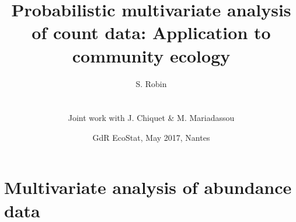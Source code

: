 \documentclass[10pt]{beamer}
\newcommand{\fignet}{/home/robin/Bureau/RECHERCHE/RESEAUX/EXPOSES/FIGURES}
\begin{document}

\title[Probabilistic PCA for counts]{Probabilistic multivariate analysis of count data: Application to community ecology}

\author[S. Robin]{S. Robin \\ ~\\
  \begin{tabular}{ll}
    Joint work with J. Chiquet \& M. Mariadassou
  \end{tabular}
  }


\date[May 2017, Nantes]{GdR EcoStat, May 2017, Nantes}

\maketitle

\section{Multivariate analysis of abundance data}

\end{document}
